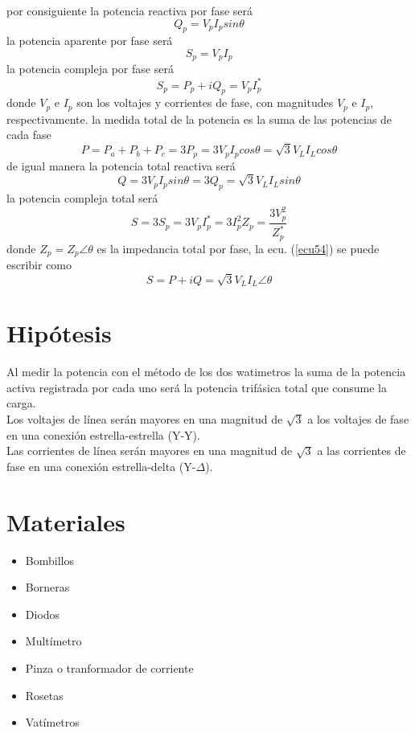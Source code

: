 \documentclass[twocolumn]{IEEEtran}
\begin{document}
\noindent
por consiguiente la potencia reactiva por fase será
\begin{equation}
 Q_p = V_p I_p sin \theta
\label{ecu49}
\end{equation}
\noindent
la potencia aparente por fase será
\begin{equation}
 S_p = V_p I_p
\label{ecu50}
\end{equation}
\noindent
la potencia compleja por fase será
\begin{equation}
 S_p = P_p + iQ_p = V_p I^{*}_p
\label{ecu51}
\end{equation}
\noindent
donde $V_p$ e $I_p$ son los voltajes y corrientes de fase, con magnitudes $V_p$ e $I_p$, respectivamente. la medida total de la potencia es la suma de las potencias de cada fase
\begin{equation}
 P = P_a + P_b + P_c = 3P_p = 3 V_p I_p cos \theta = \sqrt{3} V_L I_L cos \theta
\label{ecu52}
\end{equation}
\noindent
de igual manera la potencia total reactiva será
\begin{equation}
 Q = 3 V_p I_p sin \theta = 3 Q_p = \sqrt{3} V_L I_L sin \theta
\label{ecu53}
\end{equation}
\noindent
la potencia compleja total será
\begin{equation}
 S = 3 S_p = 3 V_p I^{*}_p = 3 I ^ {2} _p Z_p = \frac{3 V^{2}_p}{Z^{*}_p}
\label{ecu54}
\end{equation}
\noindent
donde $Z_p = Z_p \angle \theta$ es la impedancia total por fase, la ecu. (\ref{ecu54}) se puede escribir como
\begin{equation}
 S = P + iQ = \sqrt{3} V_L I_L \angle \theta
\label{ecu55}
\end{equation}

\section{Hipótesis}
\noindent
Al medir la potencia con el método de los dos watimetros la suma de la potencia activa registrada por cada uno será la potencia trifásica total que consume la carga.\\
Los voltajes de línea serán mayores en una magnitud de $\sqrt{3}$ a los voltajes de fase en una conexión estrella-estrella (Y-Y).\\
Las corrientes de línea serán mayores en una magnitud de $\sqrt{3}$ a las corrientes de fase en una conexión estrella-delta (Y-$\Delta$).

\section{Materiales}
\begin{itemize}
 \item Bombillos
 \item Borneras
 \item Diodos
 \item Multímetro
 \item Pinza o tranformador de corriente
 \item Rosetas
 \item Vatímetros
\end{itemize}
\end{document}
